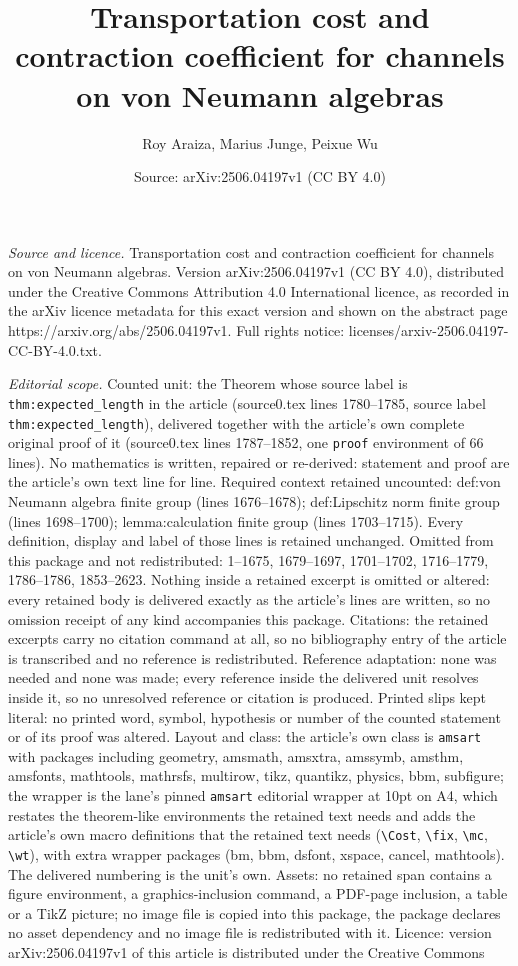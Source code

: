 \documentclass[10pt,a4paper]{amsart}
\title[Transportation cost and contraction coefficient for channels]{Transportation cost and contraction coefficient for channels on von Neumann algebras}
\author{Roy Araiza, Marius Junge, Peixue Wu}
\date{Source: arXiv:2506.04197v1 (CC BY 4.0)}
\begin{document}
\maketitle

\noindent\emph{Source and licence.} Transportation cost and contraction coefficient for channels on von Neumann algebras. Version arXiv:2506.04197v1 (CC BY 4.0), distributed under the Creative Commons Attribution 4.0 International licence, as recorded in the arXiv licence metadata for this exact version and shown on the abstract page https://arxiv.org/abs/2506.04197v1. Full rights notice: licenses/arxiv-2506.04197-CC-BY-4.0.txt.\par\smallskip

\noindent\textit{Editorial scope.} Counted unit: the Theorem whose source label is \texttt{thm:expected\_length} in the article (source0.tex lines 1780--1785, source label \texttt{thm:expected\_length}), delivered together with the article's own complete original proof of it (source0.tex lines 1787--1852, one \texttt{proof} environment of 66 lines). No mathematics is written, repaired or re-derived: statement and proof are the article's own text line for line. Required context retained uncounted: def:von Neumann algebra finite group (lines 1676--1678); def:Lipschitz norm finite group (lines 1698--1700); lemma:calculation finite group (lines 1703--1715). Every definition, display and label of those lines is retained unchanged. Omitted from this package and not redistributed: 1--1675, 1679--1697, 1701--1702, 1716--1779, 1786--1786, 1853--2623. Nothing inside a retained excerpt is omitted or altered: every retained body is delivered exactly as the article's lines are written, so no omission receipt of any kind accompanies this package. Citations: the retained excerpts carry no citation command at all, so no bibliography entry of the article is transcribed and no reference is redistributed. Reference adaptation: none was needed and none was made; every reference inside the delivered unit resolves inside it, so no unresolved reference or citation is produced. Printed slips kept literal: no printed word, symbol, hypothesis or number of the counted statement or of its proof was altered. Layout and class: the article's own class is \texttt{amsart} with packages including geometry, amsmath, amsxtra, amssymb, amsthm, amsfonts, mathtools, mathrsfs, multirow, tikz, quantikz, physics, bbm, subfigure; the wrapper is the lane's pinned \texttt{amsart} editorial wrapper at 10pt on A4, which restates the theorem-like environments the retained text needs and adds the article's own macro definitions that the retained text needs (\texttt{\textbackslash Cost}, \texttt{\textbackslash fix}, \texttt{\textbackslash mc}, \texttt{\textbackslash wt}), with extra wrapper packages (bm, bbm, dsfont, xspace, cancel, mathtools). The delivered numbering is the unit's own. Assets: no retained span contains a figure environment, a graphics-inclusion command, a PDF-page inclusion, a table or a TikZ picture; no image file is copied into this package, the package declares no asset dependency and no image file is redistributed with it. Licence: version arXiv:2506.04197v1 of this article is distributed under the Creative Commons 
\end{document}

